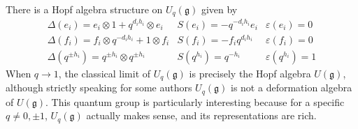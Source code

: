 \documentclass[11pt, a4paper]{article}
\theoremstyle{definition}
\newcommand{\ve}[0]{\varepsilon}
\newcommand{\D}[0]{\Delta}
\newcommand{\g}{\mathfrak g}
\begin{document}
    There is a Hopf algebra structure on $U_q(\g)$ given by
    \[
        \begin{matrix}
            \D(e_i)=e_i\otimes 1+q^{d_i h_i}\otimes e_i & S(e_i)=-q^{-d_ih_i}e_i & \ve(e_i)=0\\
            \D(f_i)=f_i\otimes q^{-d_i h_i}+1\otimes f_i & S(f_i)=-f_iq^{d_ih_i} & \ve(f_i)=0\\
            \D(q^{\pm h_i})=q^{\pm h_i}\otimes q^{\pm h_i} & S(q^{h_i})=q^{-h_i} & \ve(q^{h_i})=1
        \end{matrix}     
    \]
    When $q\to 1$, the classical limit of $U_q(\g)$ is precisely the Hopf algebra $U(\g)$, although strictly speaking for some authors $U_q(\g)$ is not a deformation algebra of $U(\g)$. This quantum group is particularly interesting because for a specific $q\neq 0,\pm 1$, $U_q(\g)$ actually makes sense, and its representations are rich. 
    
\end{document}
